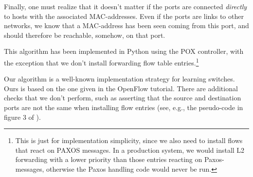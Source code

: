 Finally, one must realize that it doesn't matter if the ports are connected
\textit{directly} to hosts with the associated MAC-addresses.  Even if the
ports are links to other networks, we know that a MAC-address has been seen
coming from this port, and should therefore be reachable, somehow, on that
port.

This algorithm has been implemented in Python using the POX controller, with
the exception that we don't install forwarding flow table
entries.\footnote{This is just for implementation simplicity, since we also
need to install flows that react on PAXOS messages.  In a production
system, we would install L2 forwarding with a lower priority than those
entries reacting on Paxos-messages, otherwise the Paxos handling code would
never be run.}

Our algorithm is a well-known implementation strategy for learning
switches.  Ours is based on the one given in the OpenFlow
tutorial.
There are additional checks that we don't perform, such as
asserting that the source and destination ports are not the same when
installing flow entries (see, e.g., the pseudo-code in figure 3 of
\cite{Canini:2012:NWT:2228298.2228312}).
